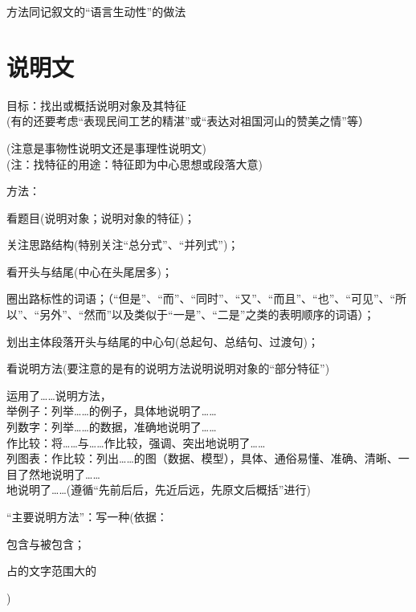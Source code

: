   方法同记叙文的``语言生动性''的做法

\section{说明文}

目标：找出或概括说明对象及其特征\\
(有的还要考虑``表现民间工艺的精湛''或``表达对祖国河山的赞美之情''等）\par
(注意是事物性说明文还是事理性说明文)\\
(注：找特征的用途：特征即为中心思想或段落大意)\par
方法：\begin{asparaenum}[(1)]\item 看题目(说明对象；说明对象的特征)；
        \item 关注思路结构(特别关注``总分式''、``并列式'')；
        \item 看开头与结尾(中心在头尾居多)；
        \item 圈出路标性的词语；（``但是''、``而''、``同时''、``又''、``而且''、``也''、``可见''、``所以''、``另外''、``然而''以及类似于``一是''、``二是''之类的表明顺序的词语）；
        \item 划出主体段落开头与结尾的中心句(总起句、总结句、过渡句)；
        \item 看说明方法(要注意的是有的说明方法说明说明对象的``部分特征'')\end{asparaenum}

运用了\ldots{}\ldots{}说明方法，\\
举例子：列举\ldots{}\ldots{}的例子，具体地说明了\ldots{}\ldots{}\\
列数字：列举\ldots{}\ldots{}的数据，准确地说明了\ldots{}\ldots{}\\
作比较：将\ldots{}\ldots{}与\ldots{}\ldots{}作比较，强调、突出地说明了\ldots{}\ldots{}\\
列图表：作比较：列出\ldots{}\ldots{}的图（数据、模型），具体、通俗易懂、准确、清晰、一目了然地说明了\ldots{}\ldots{}\\
地说明了\ldots{}\ldots{}(遵循``先前后后，先近后远，先原文后概括''进行)\par
``主要说明方法''：写一种(依据：\begin{inparaenum}[(1)]\item 包含与被包含；\item 占的文字范围大的\end{inparaenum})\\


